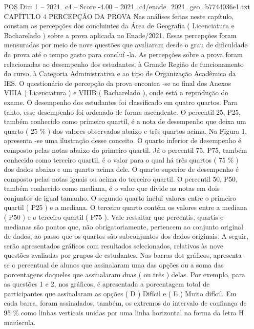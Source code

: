 \begin{textsample}{POS Dim 1 – 2021\_c4 – Score -4.00 – 2021\_c4/enade\_2021\_geo\_b7744036e1.txt}  \label{ex:f1_pos_374}
CAPÍTULO 4 PERCEPÇÃO DA PROVA Nas análises feitas neste capítulo, constam as percepções dos concluintes da Área de Geografia ( Licenciatura e Bacharelado ) sobre a prova aplicada no Enade/2021.
Essas percepções foram mensuradas por meio de nove questões que avaliaram desde o grau de dificuldade da prova até o tempo gasto para concluí -la.
As percepções sobre a prova foram relacionadas ao desempenho dos estudantes, à Grande Região de funcionamento do curso, à Categoria Administrativa e ao tipo de Organização Acadêmica da IES.
O questionário de percepção da prova encontra -se ao final dos Anexos VIIIA ( Licenciatura ) e VIIIB ( Bacharelado ), onde está a reprodução do exame.
O desempenho dos estudantes foi classificado em quatro quartos.
Para tanto, esse desempenho foi ordenado de forma ascendente.
O percentil 25, P25, também conhecido como primeiro quartil, é a nota de desempenho que deixa um quarto ( 25 \% ) dos valores observados abaixo e três quartos acima.
Na Figura 1, apresenta -se uma ilustração desse conceito.
O quarto inferior de desempenho é composto pelas notas abaixo do primeiro quartil.
Já o percentil 75, P75, também conhecido como terceiro quartil, é o valor para o qual há três quartos ( 75 \% ) dos dados abaixo e um quarto acima dele.
O quarto superior de desempenho é composto pelas notas iguais ou acima do terceiro quartil.
O percentil 50, P50, também conhecido como mediana, é o valor que divide as notas em dois conjuntos de igual tamanho.
O segundo quarto inclui valores entre o primeiro quartil ( P25 ) e a mediana.
O terceiro quarto contém os valores entre a mediana ( P50 ) e o terceiro quartil ( P75 ).
Vale ressaltar que percentis, quartis e medianas são pontos que, não obrigatoriamente, pertencem ao conjunto original de dados, ao passo que os quartos são subconjuntos dos dados originais.
A seguir, serão apresentados gráficos com resultados selecionados, relativos às nove questões avaliadas por grupos de estudantes.
Nas barras dos gráficos, apresenta -se o percentual de alunos que assinalaram uma das opções ou a soma das porcentagens daqueles que assinalaram duas ( ou três ) delas.
Por exemplo, para as questões 1 e 2, nos gráficos, é apresentada a porcentagem total de participantes que assinalaram as opções ( D ) Difícil e ( E ) Muito difícil.
Em cada barra, foram assinalados, também, os extremos do intervalo de confiança de 95 \% como linhas verticais unidas por uma linha horizontal na forma da letra H maiúscula.

\end{textsample}
